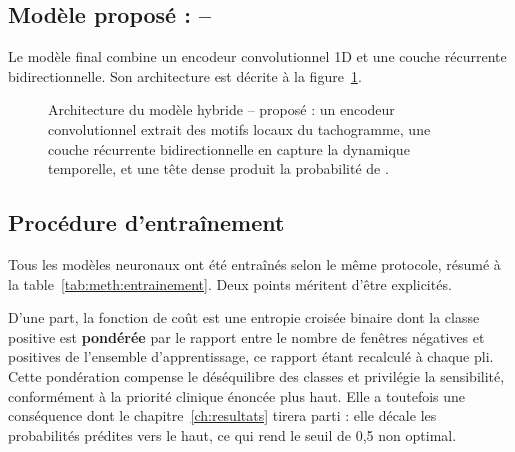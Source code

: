 \subsection{Modèle proposé : \CNN--\LSTM{}}
Le modèle final combine un encodeur convolutionnel 1D et une couche récurrente \LSTM{} bidirectionnelle. Son architecture est décrite à la figure~\ref{fig:meth:archi}.

\begin{figure}[H]
  \centering
  \caption{Architecture du modèle hybride \CNN--\LSTM{} proposé : un encodeur convolutionnel extrait des motifs locaux du tachogramme, une couche récurrente bidirectionnelle en capture la dynamique temporelle, et une tête dense produit la probabilité de \FA{}.}
  \label{fig:meth:archi}
\end{figure}

\subsection{Procédure d'entraînement}
\label{sec:meth:entrainement}
Tous les modèles neuronaux ont été entraînés selon le même protocole, résumé à la table~\ref{tab:meth:entrainement}. Deux points méritent d'être explicités.

D'une part, la fonction de coût est une entropie croisée binaire dont la classe positive est \textbf{pondérée} par le rapport entre le nombre de fenêtres négatives et positives de l'ensemble d'apprentissage, ce rapport étant recalculé à chaque pli. Cette pondération compense le déséquilibre des classes et privilégie la sensibilité, conformément à la priorité clinique énoncée plus haut. Elle a toutefois une conséquence dont le chapitre~\ref{ch:resultats} tirera parti : elle décale les probabilités prédites vers le haut, ce qui rend le seuil de 0,5 non optimal.


